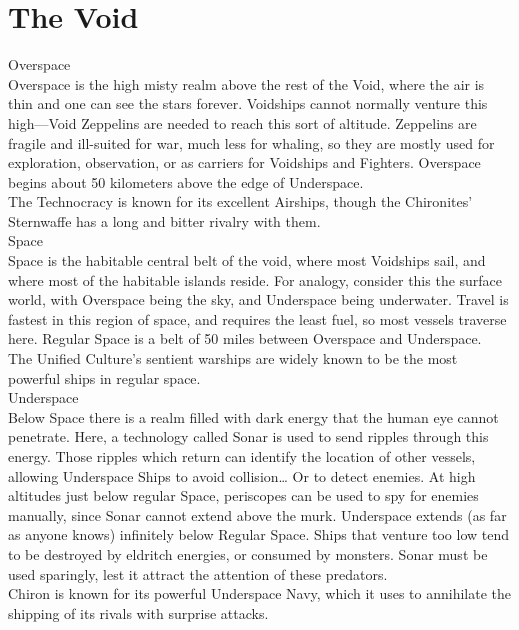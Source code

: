\documentclass[a4paper, twocolumn, openany]{book}
\begin{document}
{\section{The Void}

	{\large Overspace\\}
	Overspace is the high misty realm above the rest of the Void, where the air is thin and one can
	see the stars forever. Voidships cannot normally venture this high—Void Zeppelins are needed
	to reach this sort of altitude. Zeppelins are fragile and ill-suited for war, much less for whaling,
	so they are mostly used for exploration, observation, or as carriers for Voidships and Fighters.
	Overspace begins about 50 kilometers above the edge of Underspace.\\
	The Technocracy is known for its excellent Airships, though the Chironites’ Sternwaffe has a
	long and bitter rivalry with them.\\

	{\large Space\\}
	Space is the habitable central belt of the void, where most Voidships sail, and where most of the
	habitable islands reside. For analogy, consider this the surface world, with Overspace being the
	sky, and Underspace being underwater. Travel is fastest in this region of space, and requires
	the least fuel, so most vessels traverse here. Regular Space is a belt of 50 miles between
	Overspace and Underspace.\\
	The Unified Culture’s sentient warships are widely known to be the most powerful ships in
	regular space.\\

	{\large Underspace\\}
	Below Space there is a realm filled with dark energy that the human eye cannot penetrate.
	Here, a technology called Sonar is used to send ripples through this energy. Those ripples
	which return can identify the location of other vessels, allowing Underspace Ships to avoid
	collision… Or to detect enemies. At high altitudes just below regular Space, periscopes can be
	used to spy for enemies manually, since Sonar cannot extend above the murk. Underspace
	extends (as far as anyone knows) infinitely below Regular Space. Ships that venture too low
	tend to be destroyed by eldritch energies, or consumed by monsters. Sonar must be used
	sparingly, lest it attract the attention of these predators.\\
	Chiron is known for its powerful Underspace Navy, which it uses to annihilate the shipping of its
	rivals with surprise attacks.\\

}
\end{document}
